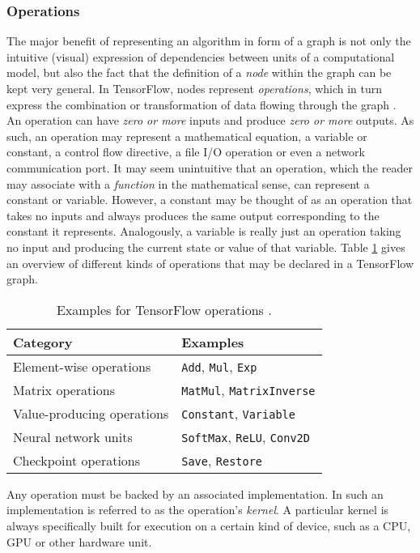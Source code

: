\subsubsection{Operations}\label{sec:model-graphs-ops}

The major benefit of representing an algorithm in form of a graph is not only
the intuitive (visual) expression of dependencies between units of a
computational model, but also the fact that the definition of a \emph{node}
within the graph can be kept very general. In TensorFlow, nodes represent
\emph{operations}, which in turn express the combination or transformation of
data flowing through the graph \cite{tensorflow}. An operation can have
\emph{zero or more} inputs and produce \emph{zero or more} outputs. As such, an
operation may represent a mathematical equation, a variable or constant, a
control flow directive, a file I/O operation or even a network communication
port. It may seem unintuitive that an operation, which the reader may associate
with a \emph{function} in the mathematical sense, can represent a constant or
variable. However, a constant may be thought of as an operation that takes no
inputs and always produces the same output corresponding to the constant it
represents. Analogously, a variable is really just an operation taking no input
and producing the current state or value of that variable. Table \ref{tab:ops}
gives an overview of different kinds of operations that may be declared in a
TensorFlow graph.

\begin{table}[b!]
  \begin{tabular}{ll}
    \textbf{Category} & \textbf{Examples}
    \\ \toprule
    Element-wise operations & \texttt{Add}, \texttt{Mul}, \texttt{Exp}
    \\
    Matrix operations & \texttt{MatMul}, \texttt{MatrixInverse}
    \\
    Value-producing operations & \texttt{Constant}, \texttt{Variable}
    \\
    Neural network units & \texttt{SoftMax}, \texttt{ReLU}, \texttt{Conv2D}
    \\
    Checkpoint operations & \texttt{Save}, \texttt{Restore}
    \\ \bottomrule
    \end{tabular}
    \label{tab:ops}
    \caption{Examples for TensorFlow operations \cite{tensorflow}.}
\end{table}

Any operation must be backed by an associated implementation. In
\cite{tensorflow} such an implementation is referred to as the operation's
\emph{kernel}. A particular kernel is always specifically built for execution on
a certain kind of device, such as a CPU, GPU or other hardware unit.

